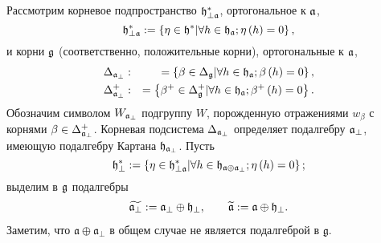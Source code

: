 Рассмотрим корневое подпространство  $\frak{h}_{\perp \frak{a}}^{\ast }$, ортогональное к $\frak{a}$,
\begin{equation*}
\frak{h}_{\perp \frak{a}}^{\ast }:=\left\{ \eta \in \frak{h}^{\ast }|\forall
h\in \frak{h}_{\frak{a}};\eta \left( h\right) =0\right\} ,
\end{equation*}
и корни  $\frak{g}$ (соответственно, положительные корни),  ортогональные к $\frak{a}$,
\begin{eqnarray}
\Delta _{\frak{a}_{\perp }} &:&=\left\{ \beta \in \Delta _{\frak{g}}|\forall
h\in \frak{h}_{\frak{a}};\beta \left( h\right) =0\right\} ,
\label{delta a ort} \\
\Delta _{\frak{a}_{\perp }}^{+} &:&=\left\{ \beta ^{+}\in \Delta _{\frak{g}%
}^{+}|\forall h\in \frak{h}_{\frak{a}};\beta ^{+}\left( h\right) =0\right\} .
\notag
\end{eqnarray}
Обозначим символом  $W_{\frak{a}_{\perp }}$ подгруппу  $W$, порожденную отражениями  $w_{\beta }$ с корнями  $\beta \in \Delta_{\frak{a}_{\perp}}^{+}$. Корневая подсистема  $\Delta _{\frak{a}_{\perp }}$ определяет подалгебру  $\frak{a}_{\perp }$, имеющую подалгебру Картана $\frak{h}_{\frak{a}_{\perp }}$. Пусть
\begin{equation*}
\frak{h}_{\perp }^{\ast }:=\left\{ \eta \in \frak{h}_{\perp \frak{a}}^{\ast
}|\forall h\in \frak{h}_{\frak{a}\oplus \frak{a}_{\perp }};\eta \left(
h\right) =0\right\};
\end{equation*}
выделим в  $\frak{g}$  подалгебры
\begin{eqnarray}
\widetilde{\frak{a}_{\perp }} :=\frak{a}_{\perp }\oplus \frak{h}_{\perp },
\qquad
\widetilde{\frak{a}} :=\frak{a}\oplus \frak{h}_{\perp }.
\end{eqnarray}
Заметим, что  $\mathfrak{a} \oplus \mathfrak{a}_{\bot}$ в общем случае не является подалгеброй в $\mathfrak{g}$.

